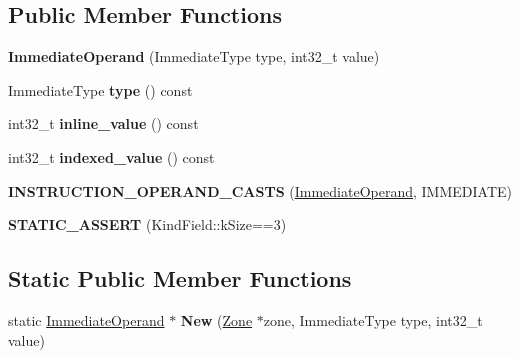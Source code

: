 \subsection*{Public Member Functions}
\begin{DoxyCompactItemize}
\item 
{\bfseries Immediate\+Operand} (Immediate\+Type type, int32\+\_\+t value)\hypertarget{classv8_1_1internal_1_1compiler_1_1_immediate_operand_a360a2f07db2401cc42400d083d9fbe66}{}\label{classv8_1_1internal_1_1compiler_1_1_immediate_operand_a360a2f07db2401cc42400d083d9fbe66}

\item 
Immediate\+Type {\bfseries type} () const \hypertarget{classv8_1_1internal_1_1compiler_1_1_immediate_operand_a61a157a468df8d0605e807949d6704e5}{}\label{classv8_1_1internal_1_1compiler_1_1_immediate_operand_a61a157a468df8d0605e807949d6704e5}

\item 
int32\+\_\+t {\bfseries inline\+\_\+value} () const \hypertarget{classv8_1_1internal_1_1compiler_1_1_immediate_operand_a53eb5c01bc9d53b8dc3b5364e5cc31d1}{}\label{classv8_1_1internal_1_1compiler_1_1_immediate_operand_a53eb5c01bc9d53b8dc3b5364e5cc31d1}

\item 
int32\+\_\+t {\bfseries indexed\+\_\+value} () const \hypertarget{classv8_1_1internal_1_1compiler_1_1_immediate_operand_a8edab326b83a26de5e2140dec03b500f}{}\label{classv8_1_1internal_1_1compiler_1_1_immediate_operand_a8edab326b83a26de5e2140dec03b500f}

\item 
{\bfseries I\+N\+S\+T\+R\+U\+C\+T\+I\+O\+N\+\_\+\+O\+P\+E\+R\+A\+N\+D\+\_\+\+C\+A\+S\+TS} (\hyperlink{classv8_1_1internal_1_1compiler_1_1_immediate_operand}{Immediate\+Operand}, I\+M\+M\+E\+D\+I\+A\+TE)\hypertarget{classv8_1_1internal_1_1compiler_1_1_immediate_operand_a4b66eecf00f82c70d0eb19d5955c5d9b}{}\label{classv8_1_1internal_1_1compiler_1_1_immediate_operand_a4b66eecf00f82c70d0eb19d5955c5d9b}

\item 
{\bfseries S\+T\+A\+T\+I\+C\+\_\+\+A\+S\+S\+E\+RT} (Kind\+Field\+::k\+Size==3)\hypertarget{classv8_1_1internal_1_1compiler_1_1_immediate_operand_ac72ffc12a25b4c120f4daca4062b8920}{}\label{classv8_1_1internal_1_1compiler_1_1_immediate_operand_ac72ffc12a25b4c120f4daca4062b8920}

\end{DoxyCompactItemize}
\subsection*{Static Public Member Functions}
\begin{DoxyCompactItemize}
\item 
static \hyperlink{classv8_1_1internal_1_1compiler_1_1_immediate_operand}{Immediate\+Operand} $\ast$ {\bfseries New} (\hyperlink{classv8_1_1internal_1_1_zone}{Zone} $\ast$zone, Immediate\+Type type, int32\+\_\+t value)\hypertarget{classv8_1_1internal_1_1compiler_1_1_immediate_operand_a9c4a87d374f9a383ee1bce00efe5e64b}{}\label{classv8_1_1internal_1_1compiler_1_1_immediate_operand_a9c4a87d374f9a383ee1bce00efe5e64b}

\end{DoxyCompactItemize}
